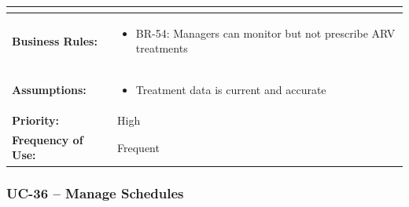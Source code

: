 \documentclass[12pt,a4paper]{article}
\begin{document}
\begin{longtable}{|p{4.5cm}|p{10.5cm}|}
\begin{itemize}
\end{itemize} \\
\hline
\textbf{Business Rules:} &
\begin{itemize}
  \item BR-54: Managers can monitor but not prescribe ARV treatments
\end{itemize} \\
\hline
\textbf{Assumptions:} &
\begin{itemize}
  \item Treatment data is current and accurate
\end{itemize} \\
\hline
\textbf{Priority:} & High \\
\hline
\textbf{Frequency of Use:} & Frequent \\
\hline
\end{longtable}

\subsubsection{UC-36 – Manage Schedules}
\end{document}
